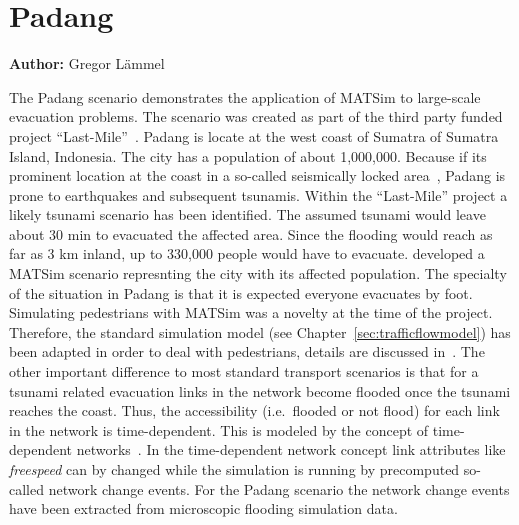 \section{Padang}
\label{sec:padang}
\hfill \textbf{Author:} Gregor Lämmel

The Padang scenario demonstrates the application of MATSim to large-scale evacuation problems. The scenario was created as part of the third party funded project ``Last-Mile''~\citep{TaubenboeckEtAl2012ConcludingLastMilePaperNatHazards}.
Padang is locate at the west coast of Sumatra of Sumatra Island, Indonesia. The city has a population of about 1,000,000. Because if its prominent location at the coast in a so-called seismically locked area~\citep{McCloskey2010Padang2009Earthquake}, Padang is prone to earthquakes and subsequent tsunamis. Within the ``Last-Mile'' project a likely tsunami scenario has been identified. The assumed tsunami would leave about 30 min to evacuated the affected area. Since the flooding would reach as far as 3 km inland, up to 330,000 people would have to evacuate. \citet{Laemmel_PhDThesis_2011} developed a MATSim scenario represnting the city with its affected population. 
The specialty of the situation in Padang is that it is expected everyone evacuates by foot. Simulating pedestrians with MATSim was a novelty at the time of the project. 
Therefore, the standard simulation model (see Chapter~\ref{sec:trafficflowmodel}) has been adapted in order to deal with pedestrians, details are discussed in~\citep{LaemmelKluepfelNagel2009EvacPadangAtBookTimmermanns}. 
The other important difference to most standard transport scenarios is that for a tsunami related evacuation links in the network become flooded once the tsunami reaches the coast. Thus, the accessibility (i.e.~flooded or not flood) for each link in the network is time-dependent. This is modeled by the concept of time-dependent networks~\citep{LaemmelEtAl_TransResC_2010}. In the time-dependent network concept link attributes  like \emph{freespeed} can by changed while the simulation is running by precomputed so-called network change events. For the Padang scenario the network change events have been extracted from microscopic flooding simulation data.

